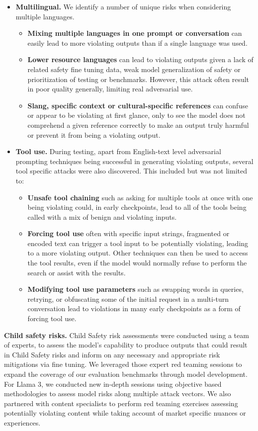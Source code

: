 \begin{itemize}
    \item \textbf{Multilingual.} We identify a number of unique risks when considering multiple languages.
    \begin{itemize}
        \item \textbf{Mixing multiple languages in one prompt or conversation} can easily lead to more violating outputs than if a single language was used.
        \item \textbf{Lower resource languages} can lead to violating outputs given a lack of related safety fine tuning data, weak model generalization of safety or prioritization of testing or benchmarks. However, this attack often result in poor quality generally, limiting real adversarial use.
        \item \textbf{Slang, specific context or cultural-specific references} can confuse or appear to be violating at first glance, only to see the model does not comprehend a given reference correctly to make an output truly harmful or prevent it from being a violating output.
    \end{itemize}

    \item \textbf{Tool use.} During testing, apart from English-text level adversarial prompting techniques being successful in generating violating outputs, several tool specific attacks were also discovered. This included but was not limited to:
    \begin{itemize}
        \item \textbf{Unsafe tool chaining} such as asking for multiple tools at once with one being violating could, in early checkpoints, lead to all of the tools being called with a mix of benign and violating inputs.
        \item \textbf{Forcing tool use} often with specific input strings, fragmented or encoded text can trigger a tool input to be potentially violating, leading to a more violating output. Other techniques can then be used to access the tool results, even if the model would normally refuse to perform the search or assist with the results.
        \item \textbf{Modifying tool use parameters} such as swapping words in queries, retrying, or obfuscating some of the initial request in a multi-turn conversation lead to violations in many early checkpoints as a form of forcing tool use.
    \end{itemize}
\end{itemize}

\textbf{Child safety risks.}
Child Safety risk assessments were conducted using a team of experts, to assess the model’s capability to produce outputs that could result in Child Safety risks and inform on any necessary and appropriate risk mitigations via fine tuning. We leveraged those expert red teaming sessions to expand the coverage of our evaluation benchmarks through model development. For Llama 3, we conducted new in-depth sessions using objective based methodologies to assess model risks along multiple attack vectors. We also partnered with content specialists to perform red teaming exercises assessing potentially violating content while taking account of market specific nuances or experiences.


